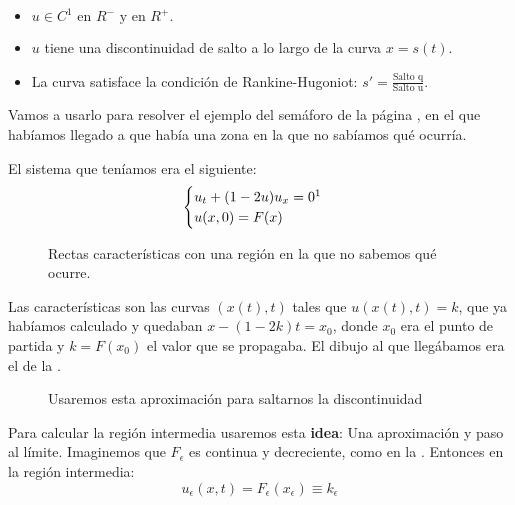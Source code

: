 			\begin{itemize}[itemsep = 1pt]
				\item $ u \in C^1 \text{ en } R^{-} \text{ y en } R^{+}. $
				\item $u$ tiene una discontinuidad de salto a lo largo de la curva $x = s(t)$.
				\item La curva satisface la condición de Rankine-Hugoniot: $s' = \frac{\text{Salto q}}{\text{Salto u}}$.
			\end{itemize}

			Vamos a usarlo para resolver el ejemplo del semáforo de la página \pageref{ejm:Semaforo}, en el que habíamos llegado a que había una zona en la que no sabíamos qué ocurría.

			\begin{example}
				El sistema que teníamos era el siguiente:
				\[
				\begin{cases} u_t + (1-2u)u_x = 0\footnote{Las curvas características exigen que el lado derecho sea 0. Si no, hay que aplicar el principio de Duhamel, el modelo con descomposición, etc.} \\
				u(x,0) = F(x)
				\end{cases} \]

				\begin{figure}[hbtp]
					\centering
					\caption{Rectas características con una región en la que no sabemos qué ocurre.}
					\label{fig:caracteristicasSemaforo2}
				\end{figure}

				Las características son las curvas $(x(t),t)$ tales que $u(x(t),t) = k$, que ya habíamos calculado y quedaban $x - (1-2k)t = x_0$, donde $x_0$ era el punto de partida y $k = F(x_0)$ el valor que se propagaba. El dibujo al que llegábamos era el de la .

				\begin{wrapfigure}{L}{0.3\textwidth}
					\centering
					\caption{Usaremos esta aproximación para saltarnos la discontinuidad}
					\label{fig:FEpsilon}
				\end{wrapfigure}

				Para calcular la región intermedia usaremos esta \textbf{idea}: Una aproximación y paso al límite. Imaginemos que $F_\epsilon$ es continua y decreciente, como en la . Entonces en la región intermedia:
				\[ u_\epsilon (x,t) = F_\epsilon (x_\epsilon) \equiv k_\epsilon \]


\end{example}
